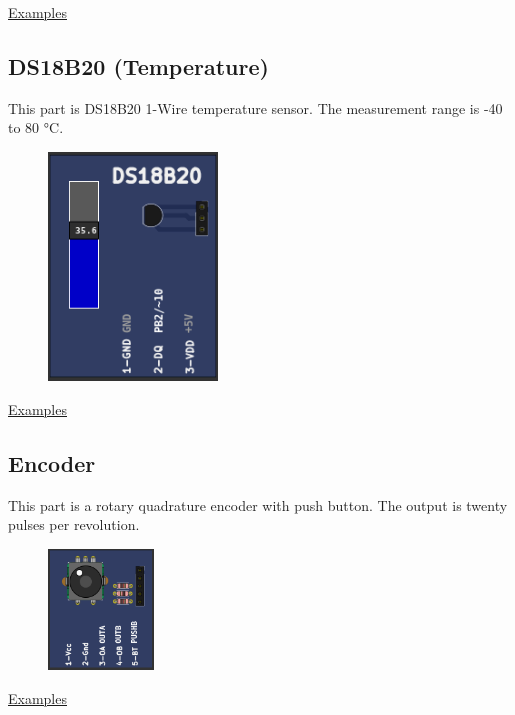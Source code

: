 \href{https://lcgamboa.github.io/picsimlab_examples/parts_DS1621_(Temperature_I2C).html}{Examples}

\subsection{DS18B20 (Temperature)}

This part is DS18B20 1-Wire temperature sensor. The measurement range is -40 to 80 °C.

\begin{figure}[H]
\center
\includegraphics[width=0.4\textwidth]{img/part_ds18b20.png} 
\end{figure} 


\href{https://lcgamboa.github.io/picsimlab_examples/parts_DS18B20_(Temperature).html}{Examples}
  
  
\subsection{Encoder}

This part is a rotary quadrature encoder with push button. The output is twenty pulses per revolution.

\begin{figure}[H]
\center
\includegraphics[width=0.25\textwidth]{img/part_encoder.png} 
\end{figure} 

\href{https://lcgamboa.github.io/picsimlab_examples/parts_Encoder.html}{Examples}
 
